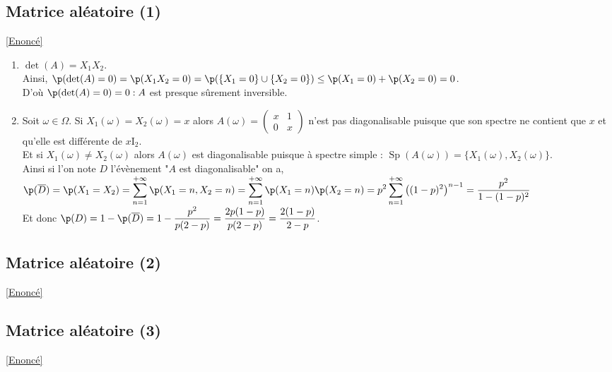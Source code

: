 \documentclass[8pt]{book}
\begin{document}
	\subsection{Matrice aléatoire (1) }
	\label{Matrice aléatoire 1 corrigé}
		\textcolor{blue}{\hyperref[Matrice aléatoire 1]{[Enoncé]}}\\
	\begin{enumerate}
		\item $\det(A)=X_1X_2$.\\
		Ainsi, $\p(\det(A)=0)=\p(X_1X_2=0)=\p(\{X_1=0\}\cup\{X_2=0\})\leq \p(X_1=0)+\p(X_2=0)=0$.\\
		D'où $\p(\det(A)=0)=0 : A$ est presque sûrement inversible.
		\item Soit $\omega\in \Omega$. Si $X_1(\omega)=X_2(\omega)=x$ alors $A(\omega)=\begin{pmatrix}
			x &1\\
			0 & x
		\end{pmatrix}$ n'est pas diagonalisable puisque que son spectre ne contient que $x$ et qu'elle est différente de $x\text{I}_2$.\\
		Et si $X_1(\omega)\ne X_2(\omega)$ alors $A(\omega)$ est diagonalisable puisque à spectre simple : $\operatorname{Sp}(A(\omega))=\{X_1(\omega),X_2(\omega)\}$.\\
		Ainsi si l'on note $D$ l'évènement "$A$ est diagonalisable" on a,\\
		$\p(\overline{D})=\p(X_1=X_2)=\displaystyle\sum\limits_{n=1}^{+\infty}\p(X_1=n,X_2=n)=\sum\limits_{n=1}^{+\infty}\p(X_1=n)\p(X_2=n)=p^2\sum\limits_{n=1}^{+\infty}\left((1-p)^2\right)^{n-1}=\frac{p^2}{1-(1-p)^2}$\\
		Et donc $\p(D)=1-\p(\overline{D})=1-\displaystyle\frac{p^2}{p(2-p)}=\frac{2p(1-p)}{p(2-p)}=\frac{2(1-p)}{2-p}$.
	\end{enumerate}
	
	\subsection{Matrice aléatoire (2)}
	\label{Matrice aléatoire 2 corrigé}
	\textcolor{blue}{\hyperref[Matrice aléatoire 2]{[Enoncé]}}\\
	
	\subsection{Matrice aléatoire (3)}
	\label{Matrice aléatoire 3 corrigé}
	\textcolor{blue}{\hyperref[Matrice aléatoire 3]{[Enoncé]}}\\
	
\end{document}
